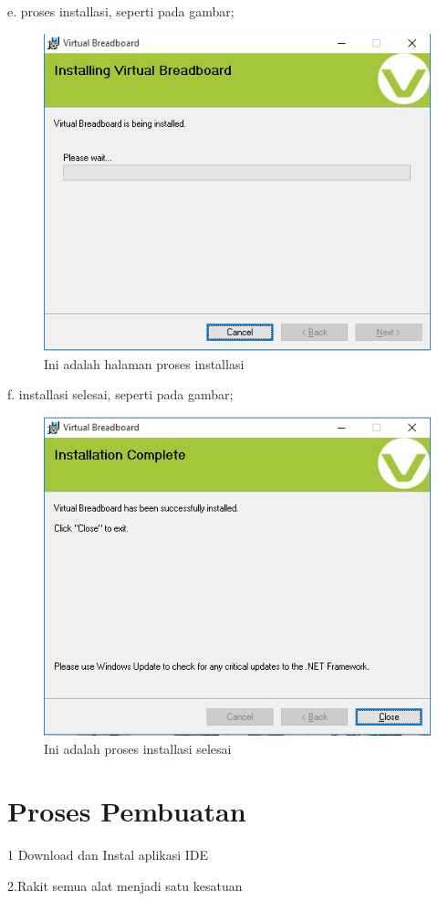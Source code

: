     e. proses installasi, seperti pada gambar;
\begin{figure}[ht]
  \centerline{\includegraphics[width=.75\textwidth]{figures/prosesinstallasi.png}}
  \caption{Ini adalah halaman proses installasi}
  \label{fig:prosesinstallasi}
  \end{figure}
    f. installasi selesai, seperti pada gambar;
\begin{figure}[ht]
  \centerline{\includegraphics[width=.75\textwidth]{figures/installasiselesai.png}}
  \caption{Ini adalah proses installasi selesai}
  \label{fig:installasiselesai}
  \end{figure}
\section{Proses Pembuatan}

1 Download dan Instal aplikasi IDE

2.Rakit semua alat menjadi satu kesatuan

